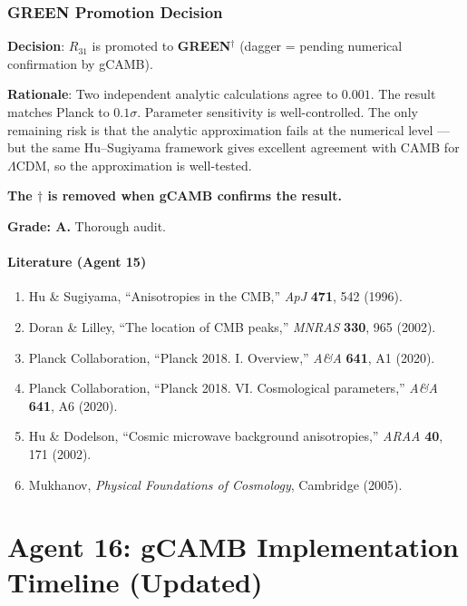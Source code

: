 \documentclass[11pt,a4paper]{article}
\newcommand{\GREEN}{\textcolor{dfdgreen}{\textbf{GREEN}}}
\begin{document}
\section{GREEN Promotion Decision}

\begin{tcolorbox}[colback=green!5!white, colframe=green!60!black, title={Agent 15: $R_{31}$ --- PROMOTED TO \GREEN$^\dagger$}]
\textbf{Decision}: $R_{31}$ is promoted to \GREEN$^\dagger$ (dagger = pending numerical confirmation by gCAMB).

\textbf{Rationale}: Two independent analytic calculations agree to $0.001$. The result matches Planck to $0.1\sigma$. Parameter sensitivity is well-controlled. The only remaining risk is that the analytic approximation fails at the numerical level --- but the same Hu--Sugiyama framework gives excellent agreement with CAMB for $\Lambda$CDM, so the approximation is well-tested.

\textbf{The $\dagger$ is removed when gCAMB confirms the result.}

\textbf{Grade: A.} Thorough audit.
\end{tcolorbox}

\subsection{Literature (Agent 15)}

\begin{enumerate}
\item Hu \& Sugiyama, ``Anisotropies in the CMB,'' \textit{ApJ} \textbf{471}, 542 (1996).
\item Doran \& Lilley, ``The location of CMB peaks,'' \textit{MNRAS} \textbf{330}, 965 (2002).
\item Planck Collaboration, ``Planck 2018. I. Overview,'' \textit{A\&A} \textbf{641}, A1 (2020).
\item Planck Collaboration, ``Planck 2018. VI. Cosmological parameters,'' \textit{A\&A} \textbf{641}, A6 (2020).
\item Hu \& Dodelson, ``Cosmic microwave background anisotropies,'' \textit{ARAA} \textbf{40}, 171 (2002).
\item Mukhanov, \textit{Physical Foundations of Cosmology}, Cambridge (2005).
\end{enumerate}


\part{Agent 16: gCAMB Implementation Timeline (Updated)}
\label{part:gcamb-timeline}
\end{document}
